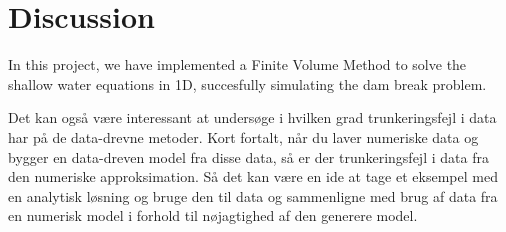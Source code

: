 \chapter{Discussion}
In this project, we have implemented a Finite Volume Method to solve the shallow water equations in 1D, succesfully simulating the dam break problem.



Det kan også være interessant at undersøge i hvilken grad trunkeringsfejl i data har på de data-drevne metoder.
Kort fortalt, når du laver numeriske data og bygger en data-dreven model fra disse data, så er der trunkeringsfejl i data fra den numeriske approksimation.
Så det kan være en ide at tage et eksempel med en analytisk løsning og bruge den til data og sammenligne med brug af data fra en numerisk model i forhold til nøjagtighed af den generere model.



